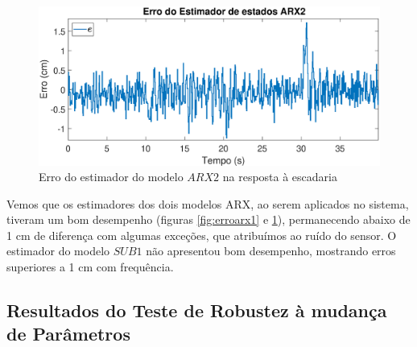 \begin{figure}[htb]
	\centering
	\includegraphics[width=1\linewidth]{erroarx2}
	\caption[Erro do estimador do modelo $ARX2$ na resposta à escadaria]{Erro do estimador do modelo $ARX2$ na resposta à escadaria}
	\label{fig:erroarx2}
\end{figure}

Vemos que os estimadores dos dois modelos ARX, ao serem aplicados no sistema, tiveram um bom desempenho (figuras \ref{fig:erroarx1} e \ref{fig:erroarx2}), permanecendo abaixo de 1 cm de diferença com algumas exceções, que atribuímos ao ruído do sensor. O estimador do modelo $SUB1$ não apresentou bom desempenho, mostrando erros superiores a 1 cm com frequência.


\subsection{Resultados do Teste de Robustez à mudança de Parâmetros}\label{rmp}

